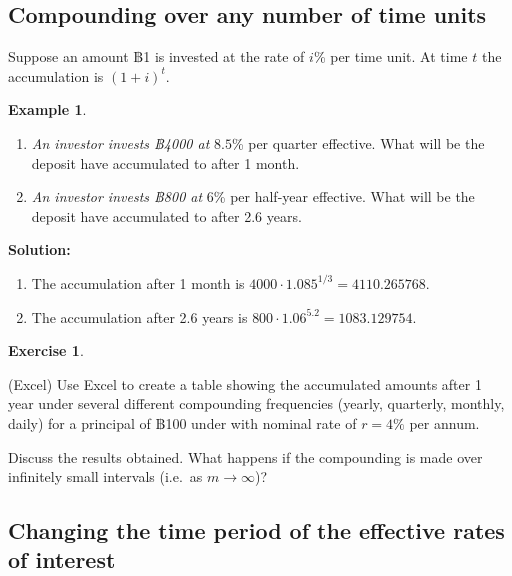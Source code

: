 \documentclass[landscape, 20pt]{extreport}
\theoremstyle{definition}
\theoremstyle{definition}
\newtheorem{example}{Example}[chapter]
\theoremstyle{definition}
\newtheorem{exercise}{Exercise}[chapter]
\theoremstyle{definition}
\theoremstyle{remark}
\begin{document}
\hypertarget{compounding-over-any-number-of-time-units}{%
\newpage \subsection{Compounding over any number of time units}\label{compounding-over-any-number-of-time-units}}

Suppose an amount ฿1 is invested at the rate of \(i\)\% per time unit. At
time \(t\) the accumulation is \((1 + i)^t\).

\newpage \begin{example}
\protect\hypertarget{exm:unlabeled-div-15}{}\label{exm:unlabeled-div-15}

\begin{enumerate}
\def\labelenumi{\arabic{enumi}.}
\item
  \emph{An investor invests ฿4000 at} \(8.5\)\% per quarter effective. What
  will be the deposit have accumulated to after 1 month.
\item
  \emph{An investor invests ฿800 at} \(6\)\% per half-year effective. What
  will be the deposit have accumulated to after 2.6 years.
\end{enumerate}

\end{example}

\textbf{Solution:}

\begin{enumerate}
\def\labelenumi{\arabic{enumi}.}
\item
  The accumulation after 1 month is
  \(4000 \cdot 1.085^{1/3} = 4110.265768.\)
\item
  The accumulation after 2.6 years is
  \(800 \cdot 1.06^{5.2} = 1083.129754.\)
\end{enumerate}

\begin{exercise}
\protect\hypertarget{exr:unlabeled-div-16}{}\label{exr:unlabeled-div-16}

(Excel) Use Excel to create a table showing the accumulated amounts after 1 year under several different compounding frequencies (yearly, quarterly, monthly, daily) for a principal of ฿100 under with nominal rate of \(r = 4\%\) per annum.

Discuss the results obtained. What happens if the compounding is made over infinitely small intervals (i.e.~as \(m \rightarrow \infty\))?

\end{exercise}

\hypertarget{changing-the-time-period-of-the-effective-rates-of-interest}{%
\newpage \subsection{Changing the time period of the effective rates of interest}\label{changing-the-time-period-of-the-effective-rates-of-interest}}
\end{document}

